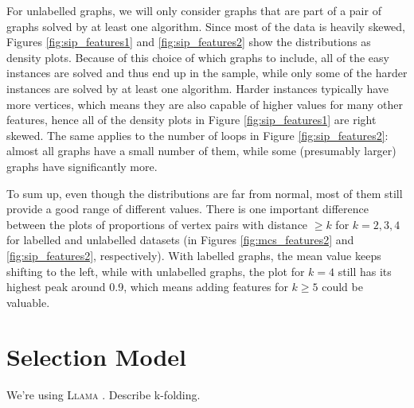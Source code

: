 \documentclass{article}
\theoremstyle{definition}
\theoremstyle{remark}
\begin{document}
For unlabelled graphs, we will only consider graphs that are part of a pair of
graphs solved by at least one algorithm. Since most of the data is heavily
skewed, Figures \ref{fig:sip_features1} and \ref{fig:sip_features2} show the
distributions as density plots. Because of this choice of which graphs to
include, all of the easy instances are solved and thus end up in the sample,
while only some of the harder instances are solved by at least one algorithm.
Harder instances typically have more vertices, which means they are also capable
of higher values for many other features, hence all of the density plots in
Figure \ref{fig:sip_features1} are right skewed. The same applies to the number
of loops in Figure \ref{fig:sip_features2}: almost all graphs have a small
number of them, while some (presumably larger) graphs have significantly more.

To sum up, even though the distributions are far from normal, most of them still
provide a good range of different values. There is one important difference
between the plots of proportions of vertex pairs with distance $\ge k$ for $k =
2, 3, 4$ for labelled and unlabelled datasets (in Figures
\ref{fig:mcs_features2} and \ref{fig:sip_features2}, respectively). With
labelled graphs, the mean value keeps shifting to the left, while with
unlabelled graphs, the plot for $k = 4$ still has its highest peak around 0.9,
which means adding features for $k \ge 5$ could be valuable.

\section{Selection Model}
We're using \textsc{Llama} \cite{kotthoff_llama_2013}. Describe k-folding.

\printbibliography
\end{document}
